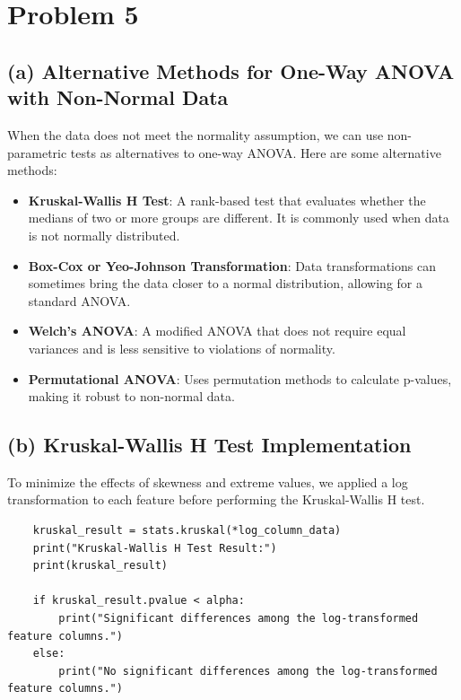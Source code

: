 \documentclass[12pt]{article}
\begin{document}
\section*{Problem 5}

\subsection*{(a) Alternative Methods for One-Way ANOVA with Non-Normal Data}

When the data does not meet the normality assumption, we can use non-parametric tests as alternatives to one-way ANOVA. Here are some alternative methods:

\begin{itemize}
    \item \textbf{Kruskal-Wallis H Test}: A rank-based test that evaluates whether the medians of two or more groups are different. It is commonly used when data is not normally distributed.
    \item \textbf{Box-Cox or Yeo-Johnson Transformation}:  Data transformations can sometimes bring the data closer to a normal distribution, allowing for a standard ANOVA.
    \item \textbf{Welch’s ANOVA}: A modified ANOVA that does not require equal variances and is less sensitive to violations of normality.
    \item \textbf{Permutational ANOVA}: Uses permutation methods to calculate p-values, making it robust to non-normal data.
\end{itemize}

\subsection*{(b) Kruskal-Wallis H Test Implementation}

To minimize the effects of skewness and extreme values, we applied a log transformation to each feature before performing the Kruskal-Wallis H test. 

\begin{verbatim}
    kruskal_result = stats.kruskal(*log_column_data)
    print("Kruskal-Wallis H Test Result:")
    print(kruskal_result)

    if kruskal_result.pvalue < alpha:
        print("Significant differences among the log-transformed feature columns.")
    else:
        print("No significant differences among the log-transformed feature columns.")

\end{verbatim}
\end{document}
